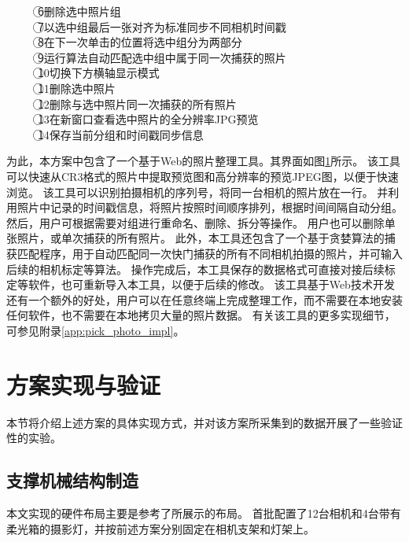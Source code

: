 \begin{figure}
{\textcircled{6}删除选中照片组\\
\textcircled{7}以选中组最后一张对齐为标准同步不同相机时间戳\\
\textcircled{8}在下一次单击的位置将选中组分为两部分\\
\textcircled{9}运行算法自动匹配选中组中属于同一次捕获的照片\\
\textcircled{10}切换下方横轴显示模式\\
\textcircled{11}删除选中照片\\
\textcircled{12}删除与选中照片同一次捕获的所有照片\\
\textcircled{13}在新窗口查看选中照片的全分辨率JPG预览\\
\textcircled{14}保存当前分组和时间戳同步信息
}
\label{fig:pick_photo}
\end{figure}
为此，本方案中包含了一个基于Web的照片整理工具。其界面如图\ref{fig:pick_photo}所示。
该工具可以快速从CR3格式的照片中提取预览图和高分辨率的预览JPEG图，以便于快速浏览。
该工具可以识别拍摄相机的序列号，将同一台相机的照片放在一行。
并利用照片中记录的时间戳信息，将照片按照时间顺序排列，根据时间间隔自动分组。
然后，用户可根据需要对组进行重命名、删除、拆分等操作。
用户也可以删除单张照片，或单次捕获的所有照片。
此外，本工具还包含了一个基于贪婪算法的捕获匹配程序，用于自动匹配同一次快门捕获的所有不同相机拍摄的照片，并可输入后续的相机标定等算法。
操作完成后，本工具保存的数据格式可直接对接后续标定等软件，也可重新导入本工具，以便于后续的修改。
该工具基于Web技术开发还有一个额外的好处，用户可以在任意终端上完成整理工作，而不需要在本地安装任何软件，也不需要在本地拷贝大量的照片数据。
有关该工具的更多实现细节，可参见附录\ref{app:pick_photo_impl}。

\section{方案实现与验证}

本节将介绍上述方案的具体实现方式，并对该方案所采集到的数据开展了一些验证性的实验。

\subsection{支撑机械结构制造}

本文实现的硬件布局主要是参考了\citet{RiviereGBGB20}所展示的布局。
首批配置了12台相机和4台带有柔光箱的摄影灯，并按前述方案分别固定在相机支架和灯架上。

